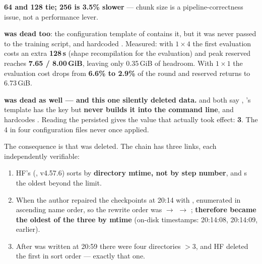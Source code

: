 \textbf{64 and 128 tie; 256 is 3.5\% slower} --- chunk size is a pipeline-correctness issue,
not a performance lever.

\textbf{ was dead too}: the configuration template of
 contains it, but it was never passed to the training script, and
 hardcoded . Measured: with $1\times4$ the first evaluation costs an
extra \textbf{128\,s} (shape recompilation for the evaluation) and peak reserved reaches
\textbf{7.65 / 8.00\,GiB}, leaving only 0.35\,GiB of headroom. With $1\times1$ the evaluation
cost drops from \textbf{6.6\% to 2.9\%} of the round and reserved returns to 6.73\,GiB.

\textbf{ was dead as well --- and this one silently deleted data.}
 and  both say
, 's template has the key but \textbf{never
builds it into the command line}, and  hardcodes .
Reading the persisted  gives the value that actually
took effect: \textbf{3}. The 4 in four configuration files never once applied.

The consequence is that  was deleted. The chain has three links, each
independently verifiable:

\begin{enumerate}
\item HF's 
      (, v4.57.6) sorts by \textbf{directory mtime, not by step
      number}, and s the oldest beyond the limit.
\item When the author repaired the checkpoints at 20:14 with
      ,  enumerated in ascending
      name order, so the rewrite order was  $\rightarrow$  $\rightarrow$
      ; \textbf{ therefore became the oldest of the three by
      mtime} (on-disk timestamps:  20:14:08, 
      20:14:09,  earlier).
\item After  was written at 20:59 there were four directories $>3$, and
      HF deleted the first in sort order --- exactly that one.
\end{enumerate}

